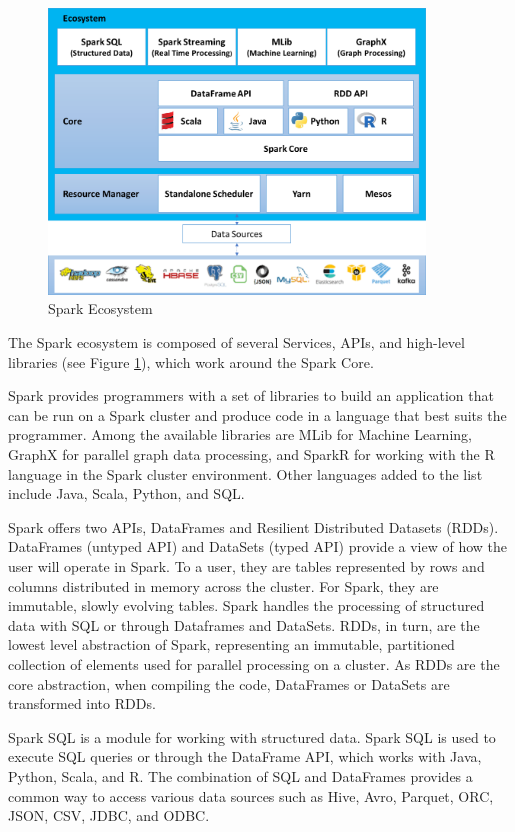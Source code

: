\documentclass[12pt,english]{book}
\begin{document}
\begin{figure}[h]
	\centering
	\includegraphics[width=10cm]{sparkSchema.png}
	\caption{Spark Ecosystem}
	\label{fig:sparkEcosystem}
\end{figure}

The Spark ecosystem is composed of several Services, APIs, and high-level libraries (see Figure \ref{fig:sparkEcosystem}), which work around the Spark Core.

Spark provides programmers with a set of libraries to build an application that can be run on a Spark cluster and produce code in a language that best suits the programmer.
Among the available libraries are MLib for Machine Learning, GraphX for parallel graph data processing, and SparkR for working with the R language in the Spark cluster environment.
Other languages added to the list include Java, Scala, Python, and SQL.

Spark offers two APIs, DataFrames and Resilient Distributed Datasets (RDDs).
DataFrames (untyped API) and DataSets (typed API) provide a view of how the user will operate in Spark.
To a user, they are tables represented by rows and columns distributed in memory across the cluster.
For Spark, they are immutable, slowly evolving tables.
Spark handles the processing of structured data with SQL or through Dataframes and DataSets.
RDDs, in turn, are the lowest level abstraction of Spark, representing an immutable, partitioned collection of elements used for parallel processing on a cluster.
As RDDs are the core abstraction, when compiling the code, DataFrames or DataSets are transformed into RDDs.

Spark SQL is a module for working with structured data.
Spark SQL is used to execute SQL queries or through the DataFrame API, which works with Java, Python, Scala, and R.
The combination of SQL and DataFrames provides a common way to access various data sources such as Hive, Avro, Parquet, ORC, JSON, CSV, JDBC, and ODBC.
\end{document}
